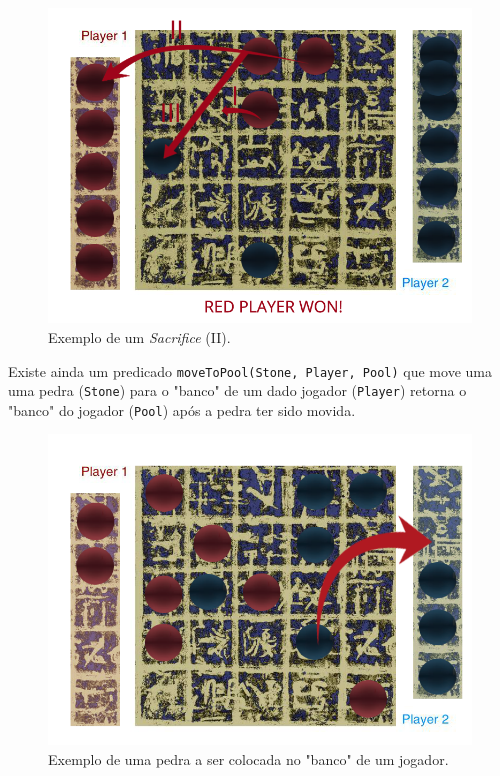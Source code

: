 \documentclass[a4paper]{article}
\begin{document}
\begin{figure}[!htb]
	\centering
	\includegraphics[scale=0.3]{images/sacrifice.png}
	\caption{Exemplo de um \textit{Sacrifice} (II).}
\end{figure}

Existe ainda um predicado \texttt{moveToPool(Stone, Player, Pool)} que move uma uma pedra (\texttt{Stone}) para o "banco" de um dado jogador (\texttt{Player}) retorna o "banco" do jogador (\texttt{Pool}) após a pedra ter sido movida.

\begin{figure}[!htb]
	\centering
	\includegraphics[scale=0.2]{images/pool.png}
	\caption{Exemplo de uma pedra a ser colocada no "banco" de um jogador.}
\end{figure}
\end{document}

